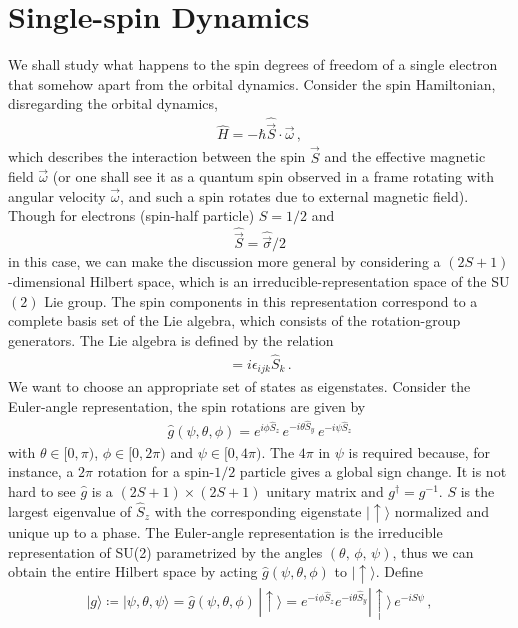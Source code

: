 \documentclass[11pt, onesided]{book}
\theoremstyle{break}
\theoremstyle{break}
\begin{document}
\section{Single-spin Dynamics}
We shall study what happens to the spin degrees of freedom of a single electron that somehow apart from the orbital dynamics. Consider the spin Hamiltonian, disregarding the orbital dynamics,
\begin{align*}
\hat{H} = -\hbar \hat{\vec{S}}\cdot \vec{\omega}\,,
\end{align*}
which describes the interaction between the spin $\vec{S}$ and the effective magnetic field $\vec{\omega}$ (or one shall see it as a quantum spin observed in a frame rotating with angular velocity $\vec{\omega}$, and such a spin rotates due to external magnetic field). Though for electrons (spin-half particle) $S = 1/2$ and $$\hat{\vec{S}} = \hat{\vec{\sigma}}/2$$ in this case, we can make the discussion more general by considering a $(2S+1)$-dimensional Hilbert space, which is an irreducible-representation space of the SU$(2)$ Lie group. The spin components in this representation correspond to a complete basis set of the Lie algebra, which consists of the rotation-group generators. The Lie algebra is defined by the relation
\begin{align*}
[\hat{S}_i, \, \hat{S}_j] = i\epsilon_{ijk}\hat{S}_k\,.
\end{align*}
We want to choose an appropriate set of states as eigenstates. Consider the Euler-angle representation, the spin rotations are given by
\begin{align*}
\hat{g}(\psi,\theta, \phi) = e^{i\phi \hat{S}_z}\, e^{-i\theta \hat{S}_y} \, e^{-i\psi \hat{S}_z}
\end{align*}
with $\theta \in [0,\pi)$, $\phi\in [0,2\pi)$ and $\psi \in [0,4\pi)$. The $4\pi$ in $\psi$ is required because, for instance, a $2\pi$ rotation for a spin-$1/2$ particle gives a global sign change. It is not hard to see $\hat{g}$ is a $(2S+1) \times (2S+1)$ unitary matrix and $g^\dagger = g^{-1}$. $S$ is the largest eigenvalue of $\hat{S}_z$ with the corresponding eigenstate $|\uparrow\rangle$ normalized and unique up to a phase. The Euler-angle representation is the irreducible representation of SU(2) parametrized by the angles $(\theta,\, \phi,\, \psi)$, thus we can obtain the entire Hilbert space by acting $\hat{g}(\psi, \theta, \phi)$ to $|\uparrow\rangle$. Define
\begin{align*}
|g\rangle \coloneqq |\psi, \theta, \psi\rangle = \hat{g}(\psi, \theta, \phi)\, |\uparrow\rangle = e^{-i\phi\hat{S}_z}e^{-i\theta\hat{S}_y}|\uparrow\rangle \, e^{-i S\psi}\,,
\end{align*}
\end{document}
